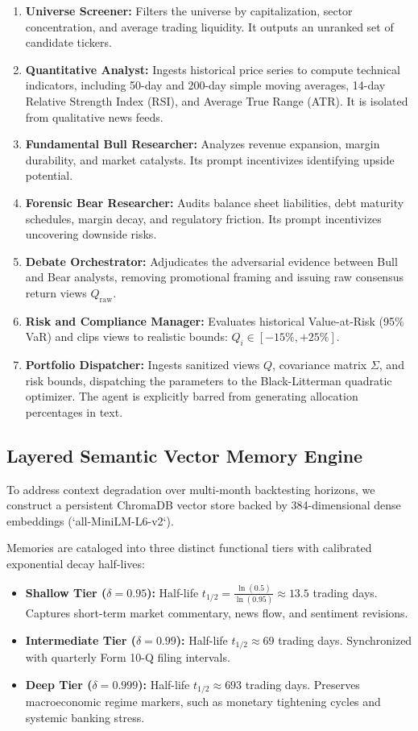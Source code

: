 \documentclass[conference]{IEEEtran}
\begin{document}
\begin{enumerate}
    \item \textbf{Universe Screener:} Filters the universe by capitalization, sector concentration, and average trading liquidity. It outputs an unranked set of candidate tickers.
    \item \textbf{Quantitative Analyst:} Ingests historical price series to compute technical indicators, including 50-day and 200-day simple moving averages, 14-day Relative Strength Index (RSI), and Average True Range (ATR). It is isolated from qualitative news feeds.
    \item \textbf{Fundamental Bull Researcher:} Analyzes revenue expansion, margin durability, and market catalysts. Its prompt incentivizes identifying upside potential.
    \item \textbf{Forensic Bear Researcher:} Audits balance sheet liabilities, debt maturity schedules, margin decay, and regulatory friction. Its prompt incentivizes uncovering downside risks.
    \item \textbf{Debate Orchestrator:} Adjudicates the adversarial evidence between Bull and Bear analysts, removing promotional framing and issuing raw consensus return views $Q_{\text{raw}}$.
    \item \textbf{Risk and Compliance Manager:} Evaluates historical Value-at-Risk (95\% VaR) and clips views to realistic bounds: $Q_i \in [-15\%, +25\%]$.
    \item \textbf{Portfolio Dispatcher:} Ingests sanitized views $Q$, covariance matrix $\Sigma$, and risk bounds, dispatching the parameters to the Black-Litterman quadratic optimizer. The agent is explicitly barred from generating allocation percentages in text.
\end{enumerate}

\subsection{Layered Semantic Vector Memory Engine}

To address context degradation over multi-month backtesting horizons, we construct a persistent ChromaDB vector store backed by 384-dimensional dense embeddings (`all-MiniLM-L6-v2`).

Memories are cataloged into three distinct functional tiers with calibrated exponential decay half-lives:
\begin{itemize}
    \item \textbf{Shallow Tier ($\delta = 0.95$):} Half-life $t_{1/2} = \frac{\ln(0.5)}{\ln(0.95)} \approx 13.5$ trading days. Captures short-term market commentary, news flow, and sentiment revisions.
    \item \textbf{Intermediate Tier ($\delta = 0.99$):} Half-life $t_{1/2} \approx 69$ trading days. Synchronized with quarterly Form 10-Q filing intervals.
    \item \textbf{Deep Tier ($\delta = 0.999$):} Half-life $t_{1/2} \approx 693$ trading days. Preserves macroeconomic regime markers, such as monetary tightening cycles and systemic banking stress.
\end{itemize}
\end{document}
